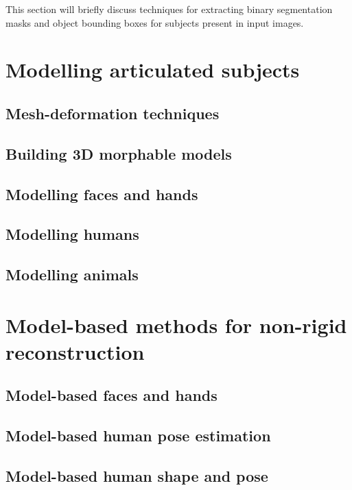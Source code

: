 This section will briefly discuss techniques for extracting binary segmentation masks and object bounding boxes for subjects present in input images.


\section{Modelling articulated subjects}

\subsection{Mesh-deformation techniques}

\subsection{Building 3D morphable models}

\subsection{Modelling faces and hands}

\subsection{Modelling humans}

\subsection{Modelling animals}

\section{Model-based methods for non-rigid reconstruction}

\subsection{Model-based faces and hands}

\subsection{Model-based human pose estimation}

\subsection{Model-based human shape and pose}

